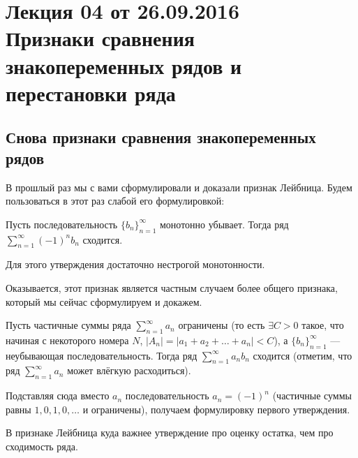 \documentclass[a4paper, 12pt]{article}
\begin{document}
\pagestyle{fancy}
\section{Лекция 04 от 26.09.2016 \\ Признаки сравнения знакопеременных рядов и перестановки ряда}
\subsection{Снова признаки сравнения знакопеременных рядов}

В прошлый раз мы с вами сформулировали и доказали признак Лейбница. Будем пользоваться в этот раз слабой его формулировкой:
\begin{Test}
	Пусть последовательность $\{b_n\}_{n = 1}^{\infty}$ монотонно убывает. Тогда ряд $\sum\limits_{n = 1}^{\infty}(-1)^n b_n$ сходится. 
\end{Test}
\begin{Comment}
	Для этого утверждения достаточно нестрогой монотонности.
\end{Comment}
Оказывается, этот признак является частным случаем более общего признака, который мы сейчас сформулируем и докажем.
\begin{Test}
	Пусть частичные суммы ряда $\sum\limits_{n=1}^{\infty}a_n$ ограничены (то есть $\exists C>0$ такое, что начиная с некоторого номера $N$, $|A_n| = |a_1 + a_2 + \ldots + a_n| < C$), а $\{b_n\}_{n=1}^{\infty}$ --- неубывающая  последовательность. Тогда ряд $\sum\limits_{n=1}^{\infty}a_nb_n$ сходится (отметим, что ряд $\sum\limits_{n=1}^{\infty}a_n$ может влёгкую расходиться). 
\end{Test}
Подставляя сюда вместо $a_n$ последовательность $a_n = (-1)^n$ (частичные суммы равны $1, 0, 1, 0, \ldots$ и ограничены), получаем формулировку первого утверждения.
\begin{Comment}
	В признаке Лейбница куда важнее утверждение про оценку остатка, чем про сходимость ряда.
\end{Comment}
\end{document}
